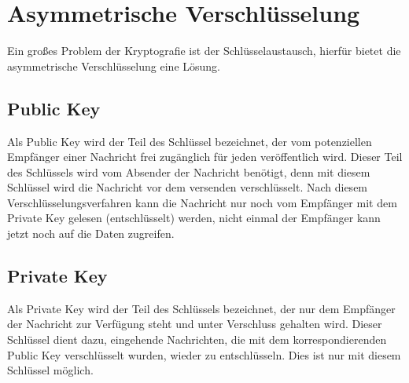 
\chapter{Asymmetrische Verschlüsselung} %


Ein großes Problem der Kryptografie ist der Schlüsselaustausch, hierfür bietet die asymmetrische Verschlüsselung eine Lösung.


\section{Public Key}
Als Public Key wird der Teil des Schlüssel bezeichnet, der vom potenziellen Empfänger einer Nachricht frei zugänglich für jeden veröffentlich wird.
Dieser Teil des Schlüssels wird vom Absender der Nachricht benötigt, denn mit diesem Schlüssel wird die Nachricht vor dem versenden verschlüsselt.
Nach diesem Verschlüsselungsverfahren kann die Nachricht nur noch vom Empfänger mit dem Private Key gelesen (entschlüsselt) werden, nicht einmal der Empfänger kann jetzt noch auf die  Daten zugreifen.



\section{Private Key}
Als Private Key wird der Teil des Schlüssels bezeichnet, der nur dem Empfänger der Nachricht zur Verfügung steht und unter Verschluss gehalten wird.
Dieser Schlüssel dient dazu, eingehende Nachrichten, die mit dem korrespondierenden Public Key verschlüsselt wurden, wieder zu entschlüsseln.
Dies ist nur mit diesem Schlüssel möglich.


